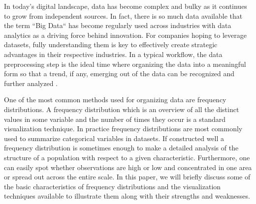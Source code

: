 In today's digital landscape, data has become complex and bulky as it continues to 
grow from independent sources. In fact, there is so much data available that the 
term ``Big Data`` has become regularly used across industries with data analytics as a 
driving force behind innovation. For companies hoping to leverage datasets, fully
understanding them is key to effectively create strategic advantages in their respective 
industries. In a typical workflow, the data preprocessing step is the ideal time 
where organizing the data into a meaningful form so that a trend, if any, emerging 
out of the data can be recognized and further analyzed \cite{c10}. 

One of the most common methods used for organizing data are frequency distributions.
A frequency distribution which is an overview of all the distinct values in some 
variable and the number of times they occur is a standard visualization technique. 
In practice frequency distributions are most commonly used to summarize categorical 
variables in datasets. If constructed well a frequency distribution is sometimes 
enough to make a detailed analysis of the structure of a population with respect 
to a given characteristic. Furthermore, one can easily spot whether observations 
are high or low and concentrated in one area or spread out across the entire scale. 
In this paper, we will briefly discuss some of the basic characteristics of 
frequency distributions and the visualization techniques available to 
illustrate them along with their strengths and weaknesses.

